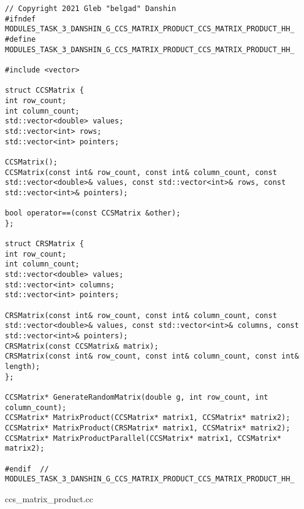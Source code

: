 \documentclass{report}
\begin{document}
\begin{lstlisting}
// Copyright 2021 Gleb "belgad" Danshin
#ifndef MODULES_TASK_3_DANSHIN_G_CCS_MATRIX_PRODUCT_CCS_MATRIX_PRODUCT_HH_
#define MODULES_TASK_3_DANSHIN_G_CCS_MATRIX_PRODUCT_CCS_MATRIX_PRODUCT_HH_

#include <vector>

struct CCSMatrix {
int row_count;
int column_count;
std::vector<double> values;
std::vector<int> rows;
std::vector<int> pointers;

CCSMatrix();
CCSMatrix(const int& row_count, const int& column_count, const std::vector<double>& values, const std::vector<int>& rows, const std::vector<int>& pointers);

bool operator==(const CCSMatrix &other);
};

struct CRSMatrix {
int row_count;
int column_count;
std::vector<double> values;
std::vector<int> columns;
std::vector<int> pointers;

CRSMatrix(const int& row_count, const int& column_count, const std::vector<double>& values, const std::vector<int>& columns, const std::vector<int>& pointers);
CRSMatrix(const CCSMatrix& matrix);
CRSMatrix(const int& row_count, const int& column_count, const int& length);
};

CCSMatrix* GenerateRandomMatrix(double g, int row_count, int column_count);
CCSMatrix* MatrixProduct(CCSMatrix* matrix1, CCSMatrix* matrix2);
CCSMatrix* MatrixProduct(CRSMatrix* matrix1, CCSMatrix* matrix2);
CCSMatrix* MatrixProductParallel(CCSMatrix* matrix1, CCSMatrix* matrix2);

#endif  // MODULES_TASK_3_DANSHIN_G_CCS_MATRIX_PRODUCT_CCS_MATRIX_PRODUCT_HH_
\end{lstlisting}

ccs\_matrix\_product.cc
\end{document}
